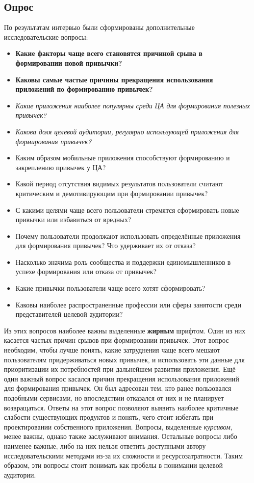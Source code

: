 \documentclass[pdflatex,sn-mathphys-num]{sn-jnl}%
\theoremstyle{thmstyleone}%
\theoremstyle{thmstyletwo}%
\theoremstyle{thmstylethree}%
\begin{document}
\subsection{Опрос}\label{Survey}

По результатам интервью были сформированы дополнительные исследовательские вопросы:

\begin{itemize}
    \item \textbf{Какие факторы чаще всего становятся причиной срыва в формировании новой привычки?}
    \item \textbf{Каковы самые частые причины прекращения использования приложений по формированию привычек?}
    \item \textit{Какие приложения наиболее популярны среди ЦА для формирования полезных привычек?}
    \item \textit{Какова доля целевой аудитории, регулярно использующей приложения для формирования привычек?}
    \item Каким образом мобильные приложения способствуют формированию и закреплению привычек у ЦА?
    \item Какой период отсутствия видимых результатов пользователи считают критическим и демотивирующим при формировании привычек?
    \item С какими целями чаще всего пользователи стремятся сформировать новые привычки или избавиться от вредных?
    \item Почему пользователи продолжают использовать определённые приложения для формирования привычек? Что удерживает их от отказа?
    \item Насколько значима роль сообщества и поддержки единомышленников в успехе формирования или отказа от привычек?
    \item Какие привычки пользователи чаще всего хотят сформировать?
    \item Каковы наиболее распространенные профессии или сферы занятости среди представителей целевой аудитории?
\end{itemize}

Из этих вопросов наиболее важны выделенные \textbf{жирным} шрифтом. Один из них касается частых причин срывов при формировании привычек. Этот вопрос необходим, чтобы лучше понять, какие затруднения чаще всего мешают пользователям придерживаться новых привычек, и использовать эти данные для приоритизации их потребностей при дальнейшем развитии приложения. Ещё один важный вопрос касался причин прекращения использования приложений для формирования привычек. Он был адресован тем, кто ранее пользовался подобными сервисами, но впоследствии отказался от них и не планирует возвращаться. Ответы на этот вопрос позволяют выявить наиболее критичные слабости существующих продуктов и понять, чего стоит избегать при проектировании собственного приложения. Вопросы, выделенные \textit{курсивом}, менее важны, однако также заслуживают внимания. Остальные вопросы либо наименее важные, либо на них нельзя ответить доступными автору исследовательскими методами из-за их сложности и ресурсозатратности. Таким образом, эти вопросы стоит понимать как пробелы в понимании целевой аудитории.
\end{document}
